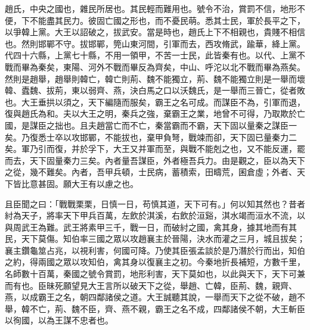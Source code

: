\begin{pinyinscope}
趙氏，中央之國也，雜民所居也。其民輕而難用也。號令不治，賞罰不信，地形不便，下不能盡其民力。彼固亡國之形也，而不憂民萌。悉其士民，軍於長平之下，以爭韓上黨。大王以詔破之，拔武安。當是時也，趙氏上下不相親也，貴賤不相信也。然則邯鄲不守。拔邯鄲，筦山東河間，引軍而去，西攻脩武，踰華，絳上黨。代四十六縣，上黨七十縣，不用一領甲，不苦一士民，此皆秦有也。以代、上黨不戰而畢為秦矣，東陽、河外不戰而畢反為齊矣，中山、呼沱以北不戰而畢為燕矣。然則是趙舉，趙舉則韓亡，韓亡則荊、魏不能獨立，荊、魏不能獨立則是一舉而壞韓、蠹魏、拔荊，東以弱齊、燕，決白馬之口以沃魏氏，是一舉而三晉亡，從者敗也。大王垂拱以須之，天下編隨而服矣，霸王之名可成。而謀臣不為，引軍而退，復與趙氏為和。夫以大王之明，秦兵之強，棄霸王之業，地曾不可得，乃取欺於亡國，是謀臣之拙也。且夫趙當亡而不亡，秦當霸而不霸，天下固以量秦之謀臣一矣。乃復悉士卒以攻邯鄲，不能拔也，棄甲負弩，戰竦而卻，天下固已量秦力二矣。軍乃引而復，并於孚下，大王又并軍而至，與戰不能剋之也，又不能反運，罷而去，天下固量秦力三矣。內者量吾謀臣，外者極吾兵力。由是觀之，臣以為天下之從，幾不難矣。內者，吾甲兵頓，士民病，蓄積索，田疇荒，囷倉虛；外者、天下皆比意甚固。願大王有以慮之也。

且臣聞之曰：「戰戰栗栗，日慎一日，苟慎其道，天下可有。」何以知其然也？昔者紂為天子，將率天下甲兵百萬，左飲於淇溪，右飲於洹谿，淇水竭而洹水不流，以與周武王為難。武王將素甲三千，戰一日，而破紂之國，禽其身，據其地而有其民，天下莫傷。知伯率三國之眾以攻趙襄主於晉陽，決水而灌之三月，城且拔矣；襄主鑽龜筮占兆，以視利害，何國可降。乃使其臣張孟談於是乃潛於行而出，知伯之約，得兩國之眾以攻知伯，禽其身以復襄主之初。今秦地折長補短，方數千里，名師數十百萬，秦國之號令賞罰，地形利害，天下莫如也，以此與天下，天下可兼而有也。臣昧死願望見大王言所以破天下之從，舉趙、亡韓，臣荊、魏，親齊、燕，以成霸王之名，朝四鄰諸侯之道。大王誠聽其說，一舉而天下之從不破，趙不舉，韓不亡，荊、魏不臣，齊、燕不親，霸王之名不成，四鄰諸侯不朝，大王斬臣以徇國，以為王謀不忠者也。


\end{pinyinscope}